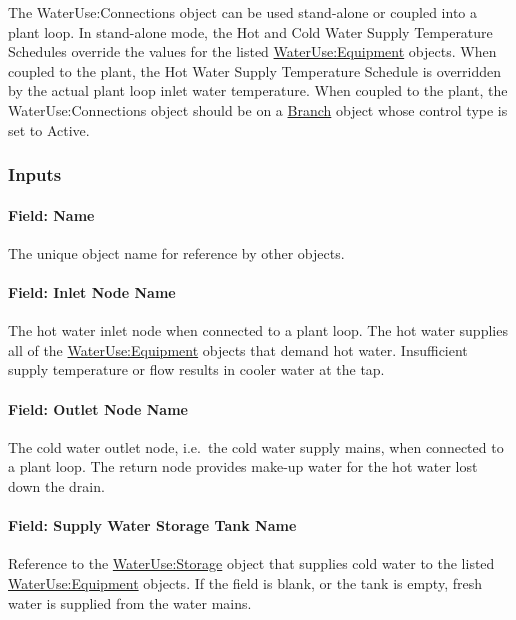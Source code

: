 The WaterUse:Connections object can be used stand-alone or coupled into a plant loop. In stand-alone mode, the Hot and Cold Water Supply Temperature Schedules override the values for the listed \hyperref[wateruseequipment]{WaterUse:Equipment} objects. When coupled to the plant, the Hot Water Supply Temperature Schedule is overridden by the actual plant loop inlet water temperature. When coupled to the plant, the WaterUse:Connections object should be on a \hyperref[branch]{Branch} object whose control type is set to Active.

\subsubsection{Inputs}\label{inputs-1-050}

\paragraph{Field: Name}\label{field-name-1-048}

The unique object name for reference by other objects.

\paragraph{Field: Inlet Node Name}\label{field-inlet-node-name-008}

The hot water inlet node when connected to a plant loop. The hot water supplies all of the \hyperref[wateruseequipment]{WaterUse:Equipment} objects that demand hot water. Insufficient supply temperature or flow results in cooler water at the tap.

\paragraph{Field: Outlet Node Name}\label{field-outlet-node-name-009}

The cold water outlet node, i.e.~the cold water supply mains, when connected to a plant loop. The return node provides make-up water for the hot water lost down the drain.

\paragraph{Field: Supply Water Storage Tank Name}\label{field-supply-water-storage-tank-name-002}

Reference to the \hyperref[waterusestorage]{WaterUse:Storage} object that supplies cold water to the listed \hyperref[wateruseequipment]{WaterUse:Equipment} objects. If the field is blank, or the tank is empty, fresh water is supplied from the water mains.

